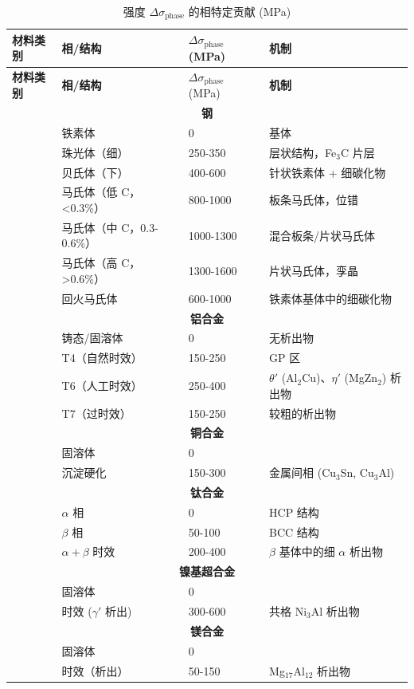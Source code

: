 \documentclass[12pt,a4paper]{article}
\begin{document}
	\begin{longtable}{p{3.5cm}p{3.0cm}p{3.0cm}p{4cm}}
		\caption{强度 \(\Delta\sigma_{\text{phase}}\) 的相特定贡献 (MPa)} \label{tab:phase-contributions} \\
		\toprule
		\textbf{材料类别} & \textbf{相/结构} & \(\Delta\sigma_{\text{phase}}\) (MPa) & \textbf{机制} \\
		\midrule
		\endfirsthead
		\toprule
		\textbf{材料类别} & \textbf{相/结构} & \(\Delta\sigma_{\text{phase}}\) (MPa) & \textbf{机制} \\
		\midrule
		\endhead
		\multicolumn{4}{c}{\textbf{钢}} \\
		& 铁素体 & 0 & 基体 \\
		& 珠光体（细） & 250-350 & 层状结构，Fe\(_3\)C 片层 \\
		& 贝氏体（下） & 400-600 & 针状铁素体 + 细碳化物 \\
		& 马氏体（低 C，<0.3\%） & 800-1000 & 板条马氏体，位错 \\
		& 马氏体（中 C，0.3-0.6\%） & 1000-1300 & 混合板条/片状马氏体 \\
		& 马氏体（高 C，>0.6\%） & 1300-1600 & 片状马氏体，孪晶 \\
		& 回火马氏体 & 600-1000 & 铁素体基体中的细碳化物 \\
		\hline
		\multicolumn{4}{c}{\textbf{铝合金}} \\
		& 铸态/固溶体 & 0 & 无析出物 \\
		& T4（自然时效） & 150-250 & GP 区 \\
		& T6（人工时效） & 250-400 & \(\theta'\) (Al\(_2\)Cu)、\(\eta'\) (MgZn\(_2\)) 析出物 \\
		& T7（过时效） & 150-250 & 较粗的析出物 \\
		\hline
		\multicolumn{4}{c}{\textbf{铜合金}} \\
		& 固溶体 & 0 & \\
		& 沉淀硬化 & 150-300 & 金属间相 (Cu\(_3\)Sn, Cu\(_3\)Al) \\
		\hline
		\multicolumn{4}{c}{\textbf{钛合金}} \\
		& \(\alpha\) 相 & 0 & HCP 结构 \\
		& \(\beta\) 相 & 50-100 & BCC 结构 \\
		& \(\alpha+\beta\) 时效 & 200-400 & \(\beta\) 基体中的细 \(\alpha\) 析出物 \\
		\hline
		\multicolumn{4}{c}{\textbf{镍基超合金}} \\
		& 固溶体 & 0 & \\
		& 时效 (\(\gamma'\) 析出) & 300-600 & 共格 Ni\(_3\)Al 析出物 \\
		\hline
		\multicolumn{4}{c}{\textbf{镁合金}} \\
		& 固溶体 & 0 & \\
		& 时效（析出） & 50-150 & Mg\(_{17}\)Al\(_{12}\) 析出物 \\
		\bottomrule
	\end{longtable}
	
\end{document}
